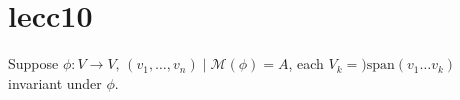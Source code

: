 \documentclass{report}
\begin{document}

\section{lecc10}




Suppose \( \phi  : V \to  V, \, (v_{1},\ldots ,v_n) \mid  \mathscr{M} (\phi )=A \), each \( V_k=)\text{span}(v_{1}\ldots v_k) \) invariant under \( \phi  \). 
\end{document}
